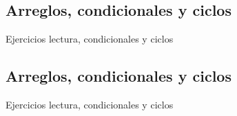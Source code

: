 \subsection{Arreglos, condicionales y ciclos}
\begin{frame}{Ejercicios lectura, condicionales y ciclos}
\end{frame}

\subsection{Arreglos, condicionales y ciclos}
\begin{frame}{Ejercicios lectura, condicionales y ciclos}
\end{frame}



